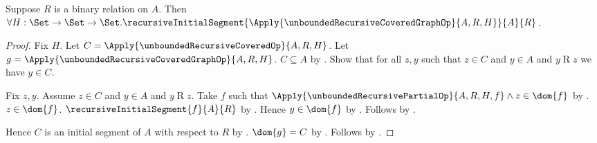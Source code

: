 \begin{proposition}\label{unbounded_recursive_covered_graph_initial}
    Suppose $R$ is a binary relation on $A$.
    Then $\forall H:\Set\to\Set\to\Set.
        \recursiveInitialSegment{
            \Apply{\unboundedRecursiveCoveredGraphOp}
                {A,R,H}}
            {A}{R}$.
\end{proposition}
\begin{proof}
    Fix $H$.
    Let $C=\Apply{\unboundedRecursiveCoveredOp}
        {A,R,H}$.
    Let $g=\Apply{\unboundedRecursiveCoveredGraphOp}
        {A,R,H}$.
    $C\subseteq A$ by .
    Show that for all $z,y$ such that $z\in C$ and $y\in A$ and
        $y\mathrel{R}z$ we have $y\in C$.
    \begin{subproof}
        Fix $z,y$.
        Assume $z\in C$ and $y\in A$ and $y\mathrel{R}z$.
        Take $f$ such that
            $\Apply{\unboundedRecursivePartialOp}
            {A,R,H,f}\land z\in\dom{f}$ by
            .
        $z\in\dom{f}$.
        $\recursiveInitialSegment{f}{A}{R}$ by
            .
        Hence $y\in\dom{f}$ by
            .
        Follows by .
    \end{subproof}
    Hence $C$ is an initial segment of $A$ with respect to $R$ by
        .
    $\dom{g}=C$ by
        .
    Follows by .
\end{proof}

